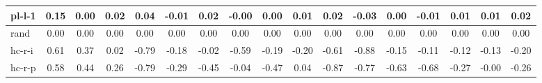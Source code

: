 \begin{tabular}{ l | c|c|c|c|c|c|c|c|c|c|c|c|c|c|c | c }
pl-l-1  & 0.15 & 0.00 & 0.02 & 0.04 & -0.01 & 0.02 & -0.00 & 0.00 & 0.01 & 0.02 & -0.03 & 0.00 & -0.01 & 0.01 & 0.01& 0.02\\\hline
rand  & 0.00 & 0.00 & 0.00 & 0.00 & 0.00 & 0.00 & 0.00 & 0.00 & 0.00 & 0.00 & 0.00 & 0.00 & 0.00 & 0.00 & 0.00& 0.00\\\hline
hc-r-i  & 0.61 & 0.37 & 0.02 & -0.79 & -0.18 & -0.02 & -0.59 & -0.19 & -0.20 & -0.61 & -0.88 & -0.15 & -0.11 & -0.12 & -0.13& -0.20\\\hline
hc-r-p  & 0.58 & 0.44 & 0.26 & -0.79 & -0.29 & -0.45 & -0.04 & -0.47 & 0.04 & -0.87 & -0.77 & -0.63 & -0.68 & -0.27 & -0.00& -0.26
\end{tabular}

